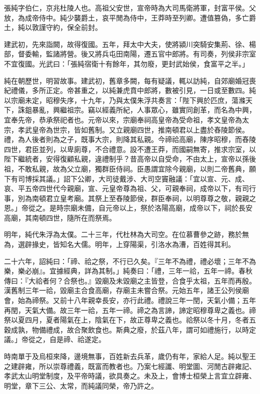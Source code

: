 
\begin{pinyinscope}
張純字伯仁，京兆杜陵人也。高祖父安世，宣帝時為大司馬衛將軍，封富平侯。父放，為成帝侍中。純少襲爵土，哀平閒為侍中，王莽時至列卿。遭值篡偽，多亡爵土，純以敦謹守約，保全前封。

建武初，先來詣闕，故得復國。五年，拜太中大夫，使將潁川突騎安集荊、徐、楊部，督委輸，監諸將營。後又將兵屯田南陽，遷五官中郎將。有司奏，列侯非宗室不宜復國。光武曰：「張純宿衛十有餘年，其勿廢，更封武始侯，食富平之半。」

純在朝歷世，明習故事。建武初，舊章多闕，每有疑議，輒以訪純，自郊廟婚冠喪紀禮儀，多所正定。帝甚重之，以純兼虎賁中郎將，數被引見，一日或至數四。純以宗廟未定，昭穆失序，十九年，乃與太僕朱浮共奏言：「陛下興於匹庶，蕩滌天下，誅鉏暴亂，興繼祖宗。竊以經義所紀，人事眾心，雖實同創革，而名為中興，宜奉先帝，恭承祭祀者也。元帝以來，宗廟奉祠高皇帝為受命祖，孝文皇帝為太宗，孝武皇帝為世宗，皆如舊制。又立親廟四世，推南頓君以上盡於舂陵節侯。禮，為人後者則為之子，既事大宗，則降其私親。今禘祫高廟，陳序昭穆，而舂陵四世，君臣並列，以卑廁尊，不合禮意。設不遭王莽，而國嗣無寄，推求宗室，以陛下繼統者，安得復顧私親，違禮制乎？昔高帝以自受命，不由太上，宣帝以孫後祖，不敢私親，故為父立廟，獨群臣侍祠。臣愚謂宜除今親廟，以則二帝舊典，願下有司博採其議。」詔下公卿，大司徒戴涉、大司空竇融議：「宜以宣、元、成、哀、平五帝四世代今親廟，宣、元皇帝尊為祖、父，可親奉祠，成帝以下，有司行事，別為南頓君立皇考廟。其祭上至舂陵節侯，群臣奉祠，以明尊尊之敬，親親之恩。」帝從之。是時宗廟未備，自元帝以上，祭於洛陽高廟，成帝以下，祠於長安高廟，其南頓四世，隨所在而祭焉。

明年，純代朱浮為太僕。二十三年，代杜林為大司空。在位慕曹參之跡，務於無為，選辟掾史，皆知名大儒。明年，上穿陽渠，引洛水為漕，百姓得其利。

二十六年，詔純曰：「禘、祫之祭，不行已久矣。『三年不為禮，禮必壞；三年不為樂，樂必崩』。宜據經典，詳為其制。」純奏曰：「禮，三年一祫，五年一禘。春秋傳曰：『大祫者何？合祭也。』毀廟及未毀廟之主皆登，合食乎太祖，五年而再殷。漢舊制三年一祫，毀廟主合食高廟，存廟主未嘗合祭。元始五年，諸王公列侯廟會，始為禘祭。又前十八年親幸長安，亦行此禮。禮說三年一閏，天氣小備；五年再閏，天氣大備。故三年一祫，五年一禘。禘之為言諦，諦定昭穆尊卑之義也。禘祭以夏四月，夏者陽氣在上，陰氣在下，故正尊卑之義也。祫祭以冬十月，冬者五穀成孰，物備禮成，故合聚飲食也。斯典之廢，於茲八年，謂可如禮施行，以時定議。」帝從之，自是禘、祫遂定。

時南單于及烏桓來降，邊境無事，百姓新去兵革，歲仍有年，家給人足。純以聖王之建辟雍，所以崇尊禮義，既富而教者也。乃案七經讖、明堂圖、河閒古辟雍記、孝武太山明堂制度，及平帝時議，欲具奏之。未及上，會博士桓榮上言宜立辟雍、明堂，章下三公、太常，而純議同榮，帝乃許之。


\end{pinyinscope}
